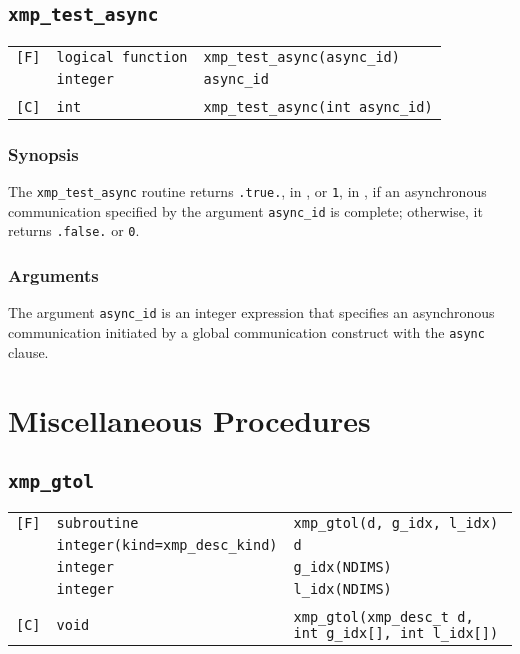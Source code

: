 \subsection{\tt xmp\_test\_async}

\begin{tabular}{lll}

\verb![F]!& {\tt logical function} & {\tt xmp\_test\_async(async\_id)}\\
          & {\tt integer} & {\tt async\_id}\\
          & & \\
\verb![C]!&  {\tt int} & {\tt  xmp\_test\_async(int async\_id)}

\end{tabular}

\subsubsection*{Synopsis}

The {\tt xmp\_test\_async} routine returns {\tt .true.}, in {\XMPF}, or
{\tt 1}, in {\XMPC}, if an asynchronous communication specified by the
argument {\tt async\_id} is complete; otherwise, it returns {\tt .false.}
or {\tt 0}.

\subsubsection*{Arguments}

The argument {\tt async\_id} is an integer expression that specifies an
asynchronous communication initiated by a global communication construct
with the {\tt async} clause.


\section{Miscellaneous Procedures}

\subsection{\tt xmp\_gtol}

\begin{tabular}{lll}

\verb![F]!& {\tt subroutine} & {\tt xmp\_gtol(d, g\_idx, l\_idx)} \\
          & {\tt integer(kind=xmp\_desc\_kind)} & {\tt d}\\
          & {\tt integer} & {\tt g\_idx(NDIMS)}\\
          & {\tt integer} & {\tt l\_idx(NDIMS)}\\
          & & \\
\verb![C]!&  {\tt void} & {\tt xmp\_gtol(xmp\_desc\_t d, int g\_idx[], int l\_idx[])}

\end{tabular}

